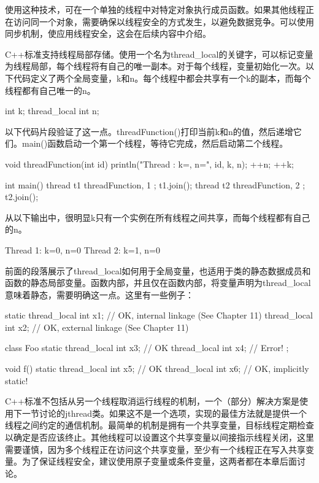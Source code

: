 使用这种技术，可在一个单独的线程中对特定对象执行成员函数。如果其他线程正在访问同一个对象，需要确保以线程安全的方式发生，以避免数据竞争。可以使用同步机制，使应用线程安全，这会在后续内容中介绍。


C++标准支持线程局部存储。使用一个名为thread\_local的关键字，可以标记变量为线程局部，每个线程将有自己的唯一副本。对于每个线程，变量初始化一次。以下代码定义了两个全局变量，k和n。每个线程中都会共享有一个k的副本，而每个线程都有自己唯一的n。

\begin{cpp}
int k;
thread_local int n;
\end{cpp}

以下代码片段验证了这一点。threadFunction()打印当前k和n的值，然后递增它们。main()函数启动一个第一个线程，等待它完成，然后启动第二个线程。

\begin{cpp}
void threadFunction(int id)
{
    println("Thread {}: k={}, n={}", id, k, n);
    ++n;
    ++k;
}

int main()
{
    thread t1 { threadFunction, 1 }; t1.join();
    thread t2 { threadFunction, 2 }; t2.join();
}
\end{cpp}

从以下输出中，很明显k只有一个实例在所有线程之间共享，而每个线程都有自己的n。

\begin{shell}
Thread 1: k=0, n=0
Thread 2: k=1, n=0
\end{shell}

前面的段落展示了thread\_local如何用于全局变量，也适用于类的静态数据成员和函数的静态局部变量。函数内部，并且仅在函数内部，将变量声明为thread\_local意味着静态，需要明确这一点。这里有一些例子：

\begin{cpp}
static thread_local int x1; // OK, internal linkage (See Chapter 11)
thread_local int x2; // OK, external linkage (See Chapter 11)

class Foo
{
    static thread_local int x3; // OK
    thread_local int x4; // Error!
};

void f()
{
    static thread_local int x5; // OK
    thread_local int x6; // OK, implicitly static!
}
\end{cpp}


C++标准不包括从另一个线程取消运行线程的机制，一个（部分）解决方案是使用下一节讨论的jthread类。如果这不是一个选项，实现的最佳方法就是提供一个线程之间约定的通信机制。最简单的机制是拥有一个共享变量，目标线程定期检查以确定是否应该终止。其他线程可以设置这个共享变量以间接指示线程关闭，这里需要谨慎，因为多个线程正在访问这个共享变量，至少有一个线程正在写入共享变量。为了保证线程安全，建议使用原子变量或条件变量，这两者都在本章后面讨论。


